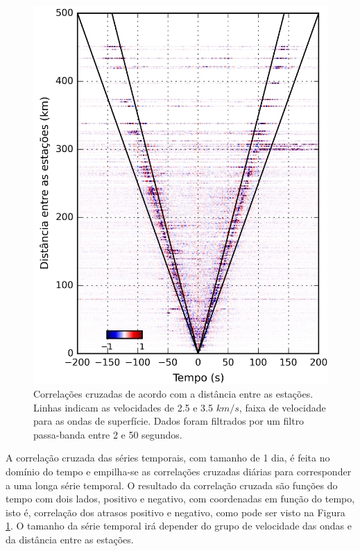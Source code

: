 \begin{figure}[!ht]
\centering
\includegraphics[scale=0.2]{Figs/correlaca_cruzada.png}
\caption[Correlações cruzadas de acordo com a distância entre as estações.]{Correlações cruzadas de acordo com a distância entre as estações. Linhas indicam as velocidades de 2.5 e 3.5 $km/s$, faixa de velocidade para as ondas de superfície. Dados foram filtrados por um filtro passa-banda entre 2 e 50 segundos.}
\label{correlacao_cruzada}
\end{figure} 

A correlação cruzada das séries temporais, com tamanho de 1 dia, é feita no domínio do tempo e empilha-se as correlações cruzadas diárias para corresponder a uma longa série temporal. 
O resultado da correlação cruzada são funções do tempo com dois lados, positivo e negativo, com coordenadas em função do tempo, isto é, correlação dos atrasos positivo e negativo, como pode ser visto na Figura \ref{correlacao_cruzada}. O tamanho da série temporal irá depender do grupo de velocidade das ondas e da distância entre as estações.

